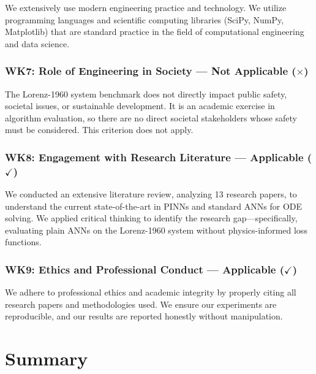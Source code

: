 We extensively use modern engineering practice and technology. We utilize programming languages and scientific computing libraries (SciPy, NumPy, Matplotlib) that are standard practice in the field of computational engineering and data science.

\subsubsection{WK7: Role of Engineering in Society --- Not Applicable ($\times$)}

The Lorenz-1960 system benchmark does not directly impact public safety, societal issues, or sustainable development. It is an academic exercise in algorithm evaluation, so there are no direct societal stakeholders whose safety must be considered. This criterion does not apply.

\subsubsection{WK8: Engagement with Research Literature --- Applicable ($\checkmark$)}

We conducted an extensive literature review, analyzing 13 research papers, to understand the current state-of-the-art in PINNs and standard ANNs for ODE solving. We applied critical thinking to identify the research gap---specifically, evaluating plain ANNs on the Lorenz-1960 system without physics-informed loss functions.

\subsubsection{WK9: Ethics and Professional Conduct --- Applicable ($\checkmark$)}

We adhere to professional ethics and academic integrity by properly citing all research papers and methodologies used. We ensure our experiments are reproducible, and our results are reported honestly without manipulation.


\section{Summary}